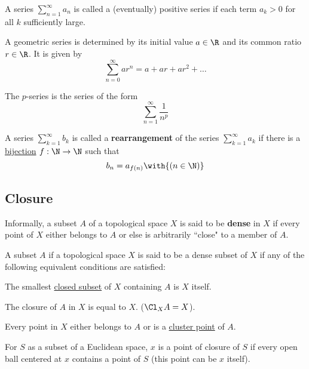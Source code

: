 \label{c09906a}

A series $\sum_{n=1}^\infty a_n$ is called a (eventually) positive series if
each term $a_k>0$ for all $k$ sufficiently large.

\label{ae21a85}

A geometric series is determined by its initial value $a\in\R$ and its common
ratio $r\in\R$. It is given by
$$
  \sum_{n=0}^\infty ar^n=a+ar+ar^2+\ldots
$$

\label{cccc2e8}

The $p$-series is the series of the form
$$
  \sum_{n=1}^\infty\frac1{n^p}
$$

\label{a58ff93}

A series $\sum_{k=1}^\infty b_k$ is called a \textbf{rearrangement} of the
series $\sum_{k=1}^\infty a_k$ if there is a \href{d205f32}{bijection}
$f:\N\to\N$ such that
$$
  b_n=a_{f(n)}\with{(n\in\N)}
$$

\subsection{Closure}\label{a052053}

\label{e14819a}

Informally, a subset $A$ of a topological space $X$ is said to be
\textbf{dense} in $X$ if every point of $X$ either belongs to $A$ or else is
arbitrarily ``close" to a member of $A$.

A subset $A$ if a topological space $X$ is said to be a dense subset of $X$ if
any of the following equivalent conditions are satisfied:
\begin{enumerati}
  \item The smallest \href{deadb92}{closed subset} of $X$ containing $A$ is $X$
        itself.
  \item The closure of $A$ in $X$ is equal to $X$. ($\Cl_XA=X$).
  \item Every point in $X$ either belongs to $A$ or is a \href{b0219cd}{cluster
        point} of $A$.
\end{enumerati}

\label{f928932}

For $S$ as a subset of a Euclidean space, $x$ is a point of closure of $S$ if
every open ball centered at $x$ contains a point of $S$ (this point can be $x$
itself).

\label{a07ff74}

